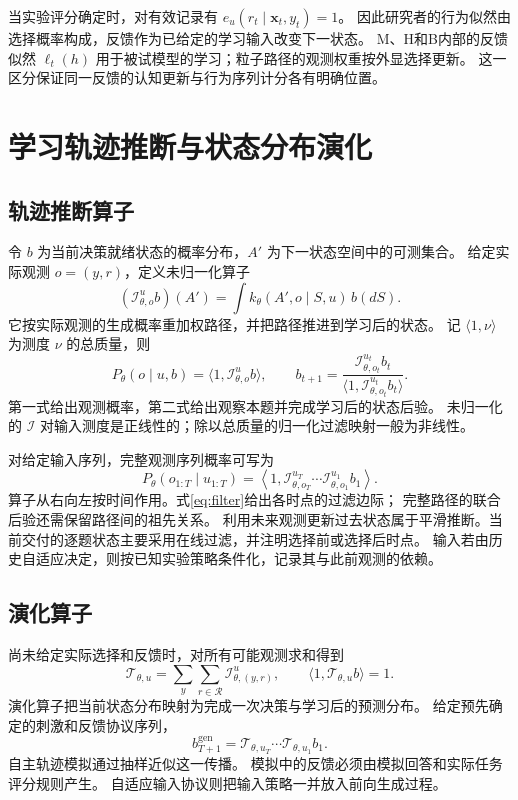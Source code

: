 \documentclass[11pt,a4paper]{article}
\numberwithin{equation}{section}
\newcommand{\Rr}{\mathcal{R}}
\newcommand{\Ii}{\mathcal{I}}
\newcommand{\Tt}{\mathcal{T}}
\begin{document}
当实验评分确定时，对有效记录有 $e_u(r_t\mid\bm x_t,y_t)=1$。
因此研究者的行为似然由选择概率构成，反馈作为已给定的学习输入改变下一状态。
M、H和B内部的反馈似然 $\ell_t(h)$ 用于被试模型的学习；粒子路径的观测权重按外显选择更新。
这一区分保证同一反馈的认知更新与行为序列计分各有明确位置。

\section{学习轨迹推断与状态分布演化}
\label{sec:operators}

\subsection{轨迹推断算子}
令 $b$ 为当前决策就绪状态的概率分布，$A'$ 为下一状态空间中的可测集合。
给定实际观测 $o=(y,r)$，定义未归一化算子
\begin{equation}
(\Ii_{\theta,o}^{u}b)(A')=\int k_\theta(A',o\mid S,u)\,b(dS).
\label{eq:inference}
\end{equation}
它按实际观测的生成概率重加权路径，并把路径推进到学习后的状态。
记 $\langle1,\nu\rangle$ 为测度 $\nu$ 的总质量，则
\begin{equation}
P_\theta(o\mid u,b)=\langle1,\Ii_{\theta,o}^{u}b\rangle,\qquad
b_{t+1}=\frac{\Ii_{\theta,o_t}^{u_t}b_t}
{\langle1,\Ii_{\theta,o_t}^{u_t}b_t\rangle}.
\label{eq:filter}
\end{equation}
第一式给出观测概率，第二式给出观察本题并完成学习后的状态后验。
未归一化的 $\Ii$ 对输入测度是正线性的；除以总质量的归一化过滤映射一般为非线性。

对给定输入序列，完整观测序列概率可写为
\begin{equation}
P_\theta(o_{1:T}\mid u_{1:T})=
\left\langle1,\Ii_{\theta,o_T}^{u_T}\cdots\Ii_{\theta,o_1}^{u_1}b_1\right\rangle.
\label{eq:sequence-operator}
\end{equation}
算子从右向左按时间作用。式\eqref{eq:filter}给出各时点的过滤边际；
完整路径的联合后验还需保留路径间的祖先关系。
利用未来观测更新过去状态属于平滑推断。当前交付的逐题状态主要采用在线过滤，并注明选择前或选择后时点。
输入若由历史自适应决定，则按已知实验策略条件化，记录其与此前观测的依赖。

\subsection{演化算子}
尚未给定实际选择和反馈时，对所有可能观测求和得到
\begin{equation}
\Tt_{\theta,u}=\sum_y\sum_{r\in\Rr}\Ii_{\theta,(y,r)}^{u},\qquad
\langle1,\Tt_{\theta,u}b\rangle=1.
\label{eq:evolution}
\end{equation}
演化算子把当前状态分布映射为完成一次决策与学习后的预测分布。
给定预先确定的刺激和反馈协议序列，
\begin{equation}
b_{T+1}^{\mathrm{gen}}=\Tt_{\theta,u_T}\cdots\Tt_{\theta,u_1}b_1.
\end{equation}
自主轨迹模拟通过抽样近似这一传播。
模拟中的反馈必须由模拟回答和实际任务评分规则产生。
自适应输入协议则把输入策略一并放入前向生成过程。
\end{document}
